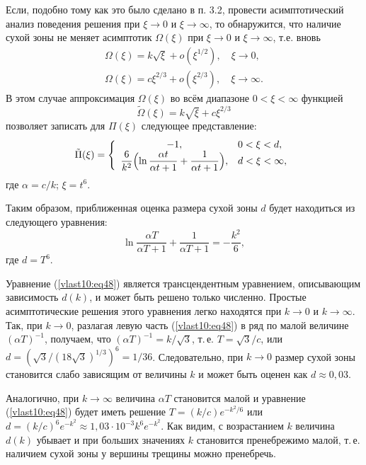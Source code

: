 Если, подобно тому как это было сделано в п. 3.2, провести
асимптотический анализ поведения решения при $\xi \to 0$ и $\xi  \to \infty $, то
обнаружится, что наличие сухой зоны не меняет асимптотик
$\Omega \left( \xi  \right)$ при
$\xi  \to 0$ и $\xi  \to
\infty $, т.е. вновь
\begin{gather}
\Omega ( \xi ) = k\sqrt \xi   + o( \xi^{1/2}), \quad  \xi \to 0,\label{vlast10:eq44}\\
\Omega ( \xi ) = c \xi ^{2/3} + o( \xi^{2/3}), \quad \xi \to \infty.\label{vlast10:eq45}
\end{gather}
В этом случае аппроксимация $\Omega (\xi)$ во всём диапазоне $0 < \xi  <
\infty $ функцией
\begin{equation}\tilde \Omega ( \xi ) = k\sqrt \xi   +
c \xi^{2/3}\label{vlast10:eq46}
\end{equation}
позволяет записать для $\Pi ( \xi )$ следующее представление:
\begin{equation}
\tilde \Pi (\xi ) = \left\{ \begin{array}{cl}
- 1, &   0 < \xi  < d, \\
\dfrac{6}{k^2} \Bigl(\ln \dfrac{\alpha t}{\alpha t + 1} +
\dfrac{1}{\alpha t + 1}\Bigr),  & d  < \xi  < \infty,
\end{array} \right. \label{vlast10:eq47}
\end{equation}
где  $\alpha  = c/k$; $\xi  = {t^6}$.

Таким образом, приближенная оценка размера сухой зоны
$d$ будет находиться из следующего уравнения:
\begin{equation}
\ln \frac{\alpha T}{\alpha T + 1} +
\frac{1}{\alpha T + 1} =  - \frac{ k^2}{6},\label{vlast10:eq48}
\end{equation}
где  $d = T^6$.

Уравнение (\ref{vlast10:eq48}) является  трансцендентным уравнением,
описывающим зависимость $d(k)$, и может быть решено только численно. Простые
асимптотические решения этого уравнения легко находятся при
$k \to 0$ и $k \to \infty $. Так, при $k \to 0$, разлагая
левую часть (\ref{vlast10:eq48}) в ряд по малой величине $(\alpha
T)^{ - 1}$, получаем, что $(\alpha T)^{ -
1} = k/{\sqrt 3 }$, т.\,е. $T = \sqrt
3 /c$, или $d = (\sqrt
3 /(18\sqrt 3 )^{1/3})^6 = 1/36$.
Следовательно, при $k \to 0$ размер
сухой зоны становится слабо зависящим от величины $k$ и может быть оценен
как $d \approx 0,03$.

Аналогично, при $k \to \infty $
величина $\alpha T$ становится малой и
уравнение (\ref{vlast10:eq48})
будет иметь решение $T = (k/c)e^{ -
k^2/6}$ или $d  =
(k/c)^6 e^{ - {k^2}} \approx 1,03 \cdot 10^{ - 3}k^6 e^{
- k^2}$. Как видим, с возрастанием $k$ величина
$d(k)$ убывает и при больших
значениях $k$ становится пренебрежимо малой, т.\,е. наличием сухой зоны у
вершины трещины можно пренебречь.


